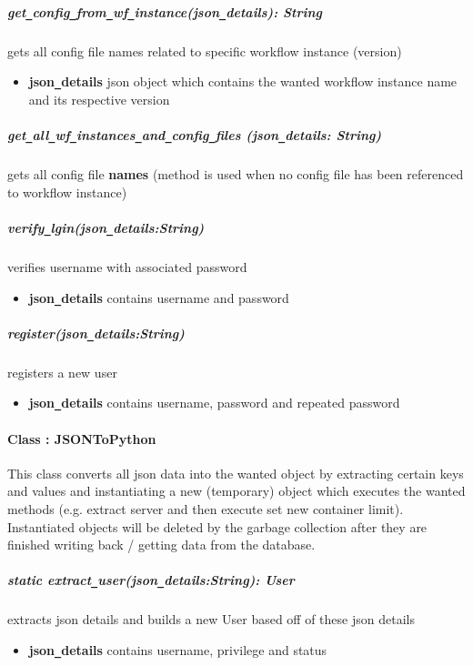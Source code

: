 \subparagraph{get\texttt{\_}config\texttt{\_}from\texttt{\_}wf\texttt{\_}instance(json\texttt{\_}details): String}
gets all config file names related to specific workflow instance (version)
\begin{itemize}
        \item \textbf{json\texttt{\_}details}
        json object which contains the wanted workflow instance name and its respective version
\end{itemize}


\subparagraph{get\texttt{\_}all\texttt{\_}wf\texttt{\_}instances\texttt{\_}and\texttt{\_}config\texttt{\_}files
(json\texttt{\_}details: String)}
gets all  config file \textbf{names} (method is used when no config file has been referenced to workflow instance)

\subparagraph{verify\texttt{\_}lgin(json\texttt{\_}details:String)}
verifies username with associated password
\begin{itemize}
        \item \textbf{json\texttt{\_}details}
        contains username and password
\end{itemize}

\subparagraph{register(json\texttt{\_}details:String)}
registers a new user
\begin{itemize}
        \item \textbf{json\texttt{\_}details}
        contains username, password and repeated password
\end{itemize}

\paragraph{Class : JSONToPython}
This class converts all json data into the wanted object by extracting certain keys and values and instantiating
a new (temporary) object which executes the wanted methods (e.g. extract server and then execute set new container limit).
Instantiated objects will be deleted by the garbage collection after they are finished writing back / getting data
from the database.

\subparagraph{static extract\texttt{\_}user(json\texttt{\_}details:String): User}
extracts json details and builds a new User based off of these json details
\begin{itemize}
        \item \textbf{json\texttt{\_}details}
        contains username, privilege and status
\end{itemize}


